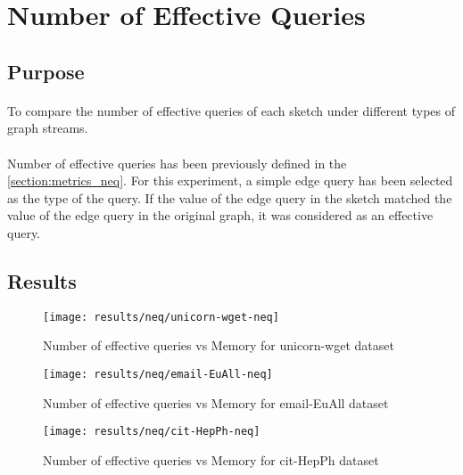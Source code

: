 \section{Number of Effective Queries}

\subsection*{Purpose}

\paragraph{}
To compare the number of effective queries of each sketch under different types of graph streams. 

\paragraph{}
Number of effective queries has been previously defined in the \autoref{section:metrics_neq}. For this experiment, a simple edge query has been selected as the type of the query. If the value of the edge query in the sketch matched the value of the edge query in the original graph, it was considered as an effective query.

\subsection*{Results}

\begin{figure}[H]
    \centering \texttt{[image: results/neq/unicorn-wget-neq]}
    \vspace{-0.5cm}
    \caption{Number of effective queries vs Memory for unicorn-wget dataset}
    \label{fig:unicorn-wget-neq}
\end{figure}

\begin{figure}[H]
    \centering \texttt{[image: results/neq/email-EuAll-neq]}
    \vspace{-0.5cm}
    \caption{Number of effective queries vs Memory for email-EuAll dataset}
    \label{fig:email-EuAll-neq}
\end{figure}

\begin{figure}[H]
    \centering \texttt{[image: results/neq/cit-HepPh-neq]}
    \vspace{-0.5cm}
    \caption{Number of effective queries vs Memory for cit-HepPh dataset}
    \label{fig:cit-HepPh-neq}
\end{figure}

